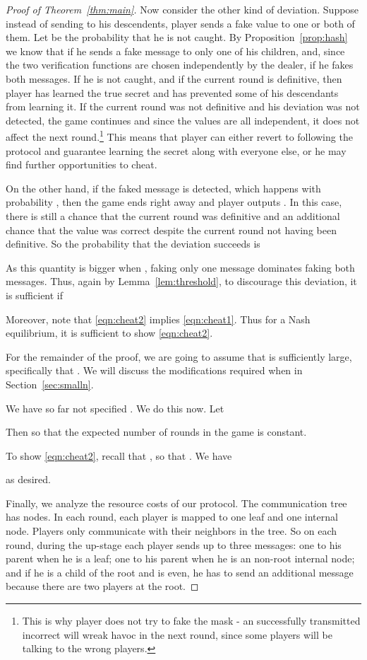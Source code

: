 \documentclass[12pt]{article}
\theoremstyle{definition}
\begin{document}
\begin{proof}[Proof of Theorem~\ref{thm:main}]
Now consider the other kind of deviation. Suppose instead of sending  to 
his descendents, player  sends a fake value to one or both of them. Let 
 be the probability that he is not caught. By 
Proposition~\ref{prop:hash} we know that  if he sends 
a fake message to only one of his children, and, since the two verification 
functions are chosen independently by the dealer, 
if he fakes both messages.
If he is not caught, and if the current round is definitive, then
player  has learned the true secret and has prevented some of his descendants from 
learning it.   If the current round was not definitive and his deviation 
was not detected, the game continues and since the values  are all 
independent, it does not affect the next round.\footnote{This is why player  does 
not try to fake the mask  - an successfully transmitted incorrect 
 will wreak havoc in the next round, since some players will be 
talking to the wrong players.} This means that player  can either revert to 
following the protocol and guarantee learning the secret along with everyone 
else, or he may find further opportunities to cheat.

On the other hand, if the faked message is detected, which happens with probability 
, then the game ends right away and player  
outputs . In this case, there is still a  chance that the current 
round was definitive and an additional  chance that the 
value  was correct despite the current round not having been definitive.
So the probability that the deviation succeeds is 

As this quantity is bigger when , faking only one 
message dominates faking both messages.
Thus, again by Lemma~\ref{lem:threshold}, to discourage this deviation, it is 
sufficient if

Moreover, note that \eqref{eqn:cheat2} implies \eqref{eqn:cheat1}.
Thus for a Nash equilibrium, it is sufficient to show \eqref{eqn:cheat2}.

For the remainder of the proof, we are going to assume that  is 
sufficiently large, specifically that . 
We will discuss the modifications required when 
 in Section~\ref{sec:smalln}. 

We have so far not specified . We do this now.
Let 

Then  so that the expected number of rounds in the game 
is constant. 

To show \eqref{eqn:cheat2}, recall that , so that .
We have

as desired.
\smallskip

Finally, we analyze the resource costs of our protocol.  The communication
tree has  nodes. In each round, each player is mapped to one leaf and 
one internal node.  Players only communicate with their neighbors in
the tree. So on each round, during the up-stage each player sends up to three 
messages: one to his parent when he is a leaf; one to his parent when he is 
an non-root internal node; and if he is a child of the root and  is even, 
he has to send an additional message because there are two players at the 
root.


\end{proof}
\end{document}
